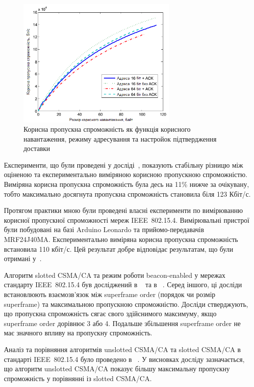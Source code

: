 \documentclass[a4paper,ukrainian,utf8,nocolumnsxix,nocolumnxxxii,nocolumnxxxi,floatsection,equationsection]{eskdtext}
\newcommand{\longcaption}[1]{\captionsetup{style=figureLongCaption}\caption{#1}}
\newcommand{\iee}[0]{IEEE~802.15.4\xspace}
\newcommand{\csma}[0]{CSMA/CA\xspace}
\newcommand{\ucsma}[0]{unslotted \csma{}\xspace}
\newcommand{\scsma}[0]{slotted \csma{}\xspace}
\newcommand{\bem}[0]{beacon-enabled\xspace}
\begin{document}
\begin{figure}[bth]
	\centering
	\includegraphics[width=0.7\textwidth]{img/throughput_graph.png}
	\longcaption{\label{fig:throughput_graph}Корисна пропускна спроможність як функція корисного навантаження, режиму адресування та настройок підтвердження доставки}
\end{figure}

Експерименти, що були проведені у досліді~\cite{thoroughput:analysis:unslotted:ieee}, показують стабільну різницю між оціненою та експериментально виміряною корисною пропускною спроможністю. Виміряна корисна пропускна спроможність була десь на 11\% нижче за очікувану, тобто максимально досягнута пропускна спроможність становила біля 123 Кбіт/с.

Протягом практики мною були проведені власні експерименти по вимірюванню корисної пропускної спроможності мереж \iee. Вимірювальні пристрої були побудовані на базі Arduino Leonardo та прийомо-передавачів MRF24J40MA. Експериментально виміряна корисна пропускна спроможність встановила 110 кбіт/с. Цей результат добре відповідає результатам, що були отримані у~\cite{thoroughput:analysis:unslotted:ieee}.

Алгоритм \scsma та режим роботи \bem у мережах стандарту \iee був досліджений в ~\cite{simulation:study:slotted:ieee} та в ~\cite{gts:allocation:analysis}. Серед іншого, ці досліди встановлюють взаємозв'язок між superframe order (порядок чи розмір superframe) та максимальною пропускною спроможністю. Досліди стверджують, що пропускна спроможність сягає свого здійснимого максимуму, якщо superframe order дорівнює 3 або 4. Подальше збільшення superframe order не має значного впливу на пропускну спроможність.

Аналіз та порівняння алгоритмів \ucsma та \scsma в стандарті \iee було проведено в ~\cite{analysis:slotted:unslotted}. У висновках досліду зазначається, що алгоритм \ucsma  показує більшу максимальну пропускну спроможність у порівнянні із \scsma.
\end{document}
